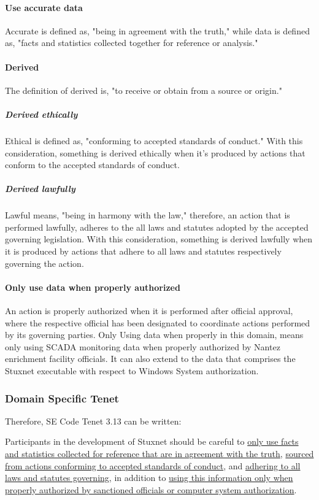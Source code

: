 \documentclass[12pt]{article}
\begin{document}
\begin{multicols}{2}
\paragraph{Use accurate data}
Accurate is defined as, "being in agreement with the truth," while data is defined as, "facts and statistics collected together for reference or analysis."\cite{cambridgeDictionary}

\paragraph{Derived}
The definition of derived is, "to receive or obtain from a source or origin."\cite{softwareDefinition}

\subparagraph{Derived ethically}
Ethical is defined as, "conforming to accepted standards of conduct."\cite{cambridgeDictionary} With this consideration, something is derived ethically when it's produced by actions that conform to the accepted standards of conduct.

\subparagraph{Derived lawfully}
Lawful means, "being in harmony with the law," therefore, an action that is performed lawfully, adheres to the all laws and statutes adopted by the accepted governing legislation.\cite{cambridgeDictionary} With this consideration, something is derived lawfully when it is produced by actions that adhere to all laws and statutes respectively governing the action.

\paragraph{Only use data when properly authorized}
An action is properly authorized when it is performed after official approval, where the respective official has been designated to coordinate actions performed by its governing parties. Only Using data when properly in this domain, means only using SCADA monitoring data when properly authorized by Nantez enrichment facility officials. It can also extend to the data that comprises the Stuxnet executable with respect to Windows System authorization.

\subsubsection{Domain Specific Tenet}

Therefore, SE Code Tenet 3.13 can be written:
\begin{framed}
Participants in the development of Stuxnet should be careful to \ul{only use facts and statistics collected for reference that are in agreement with the truth}, \ul{sourced from actions conforming to accepted standards of conduct}, and \ul{adhering to all laws and statutes governing}, in addition to \ul{using this information only when properly authorized by sanctioned officials or computer system authorization}.
\end{framed}


\end{multicols}
\end{document}
